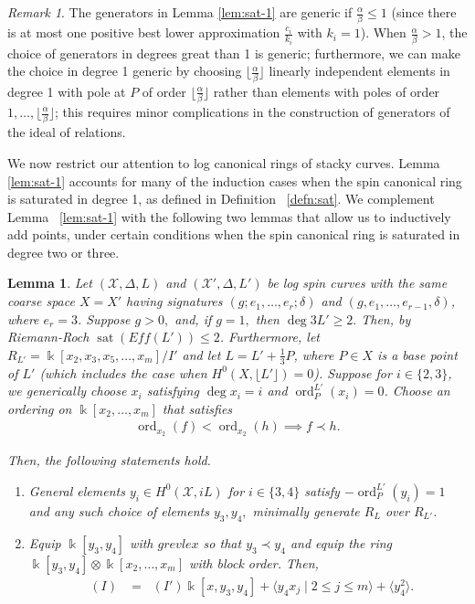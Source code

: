 \documentclass{amsart}
\theoremstyle{plain}
\newtheorem{lem}[thm]{Lemma}
\theoremstyle{definition}
\theoremstyle{remark}
\newtheorem{rem}[thm]{Remark}
\numberwithin{equation}{section}
\newcommand\Bk{{\Bbbk}}
\DeclareMathOperator{\ord}{ord}
\newcommand\sx{\mathscr X}
\newcommand{\halfcan}{L}
\DeclareMathOperator{\initial}{in_\prec}
\DeclareMathOperator{\sat}{sat}
\begin{document}
\begin{rem}\label{rem:sat-1-gen-lem-generic}
The generators in Lemma \ref{lem:sat-1} are generic if $\frac{\alpha}{\beta}\le 1$ (since there is at most one positive best lower approximation $\frac{c_i}{k_i}$ with $k_i=1$).  When $\frac{\alpha}{\beta}>1$, the choice of generators in degrees great than 1 is generic; furthermore, we can make the choice in degree 1 generic by choosing $\lfloor \frac{\alpha}{\beta}\rfloor$ linearly independent elements in degree 1 with pole at $P$ of order $\lfloor \frac{\alpha}{\beta}\rfloor$ rather than elements with poles of order $1, \ldots, \lfloor \frac{\alpha}{\beta}\rfloor$; this requires minor complications in the construction of generators of the ideal of relations.
\end{rem}

We now restrict our attention to log canonical rings of stacky curves.  Lemma \ref{lem:sat-1} accounts for many of the induction cases when the spin canonical ring is saturated in degree 1, as defined in Definition ~\ref{defn:sat}.  We complement Lemma ~\ref{lem:sat-1} with the following two lemmas that allow us to inductively add points, under certain conditions when the spin canonical ring is saturated in degree two or three.

\begin{lem}
\label{lem:sat-2}
Let $(\sx, \Delta, \halfcan)$ and $(\sx', \Delta, \halfcan')$ be log spin curves with the same coarse space $X = X'$ having signatures $(g; e_1, \ldots, e_r; \delta)$ and $(g, e_1, \ldots, e_{r- 1}, \delta)$, where $e_r=3$.  Suppose $g > 0,$ and, if $g = 1,$ then $\deg 3\halfcan' \geq 2.$ Then, by Riemann-Roch $\sat(Eff(L'))\le 2$.
Furthermore, let $R_{\halfcan'} = \Bk[x_2, x_3
, x_5, \ldots, x_m]/I'$ and let $\halfcan = \halfcan' + \frac{1}{
3}P$, where $P\in X$ is a base point of $\halfcan'$ (which includes the case when $H^0(X, \lfloor \halfcan'\rfloor) = 0$).
Suppose for $i \in \{2, 3\}$, we generically choose $x_i$ satisfying $\deg x_i = i$ and $\ord_P^{\halfcan'}(x_i)= 0$. Choose an ordering on $\Bk[x_2, \ldots, x_m]$ that satisfies
\begin{align*}
	\ord_{x_2}(f) < \ord_{x_2}(h) \implies f \prec h.
\end{align*}

\noindent
Then, the following statements hold.

\begin{enumerate}
	\item[(a)] General elements  $y_i \in H^0(\sx,iL)$ for $i \in
		\{3, 4\}$ satisfy $-\ord_P^{\halfcan'}(y_i) = 1$ and any such choice of elements
		$y_3, y_4,$ minimally generate $R_\halfcan$ over $R_{\halfcan'}$.
	\item[(b)] Equip $\Bk[y_3, y_4]$ with $grevlex$ so that $y_3 \prec 
		y_4$
		and equip the ring $\Bk[y_3, y_4] \otimes \Bk[x_2, \ldots, x_m]$ with block 
		order. Then,
		\begin{align*}
			\initial(I) &= \initial(I')\Bk[x, y_3, y_4]+\langle y_4 x_j \mid 2 \leq j \leq m \rangle +\langle y_4^2 \rangle.
		\end{align*}
\end{enumerate}
\end{lem}
\end{document}
